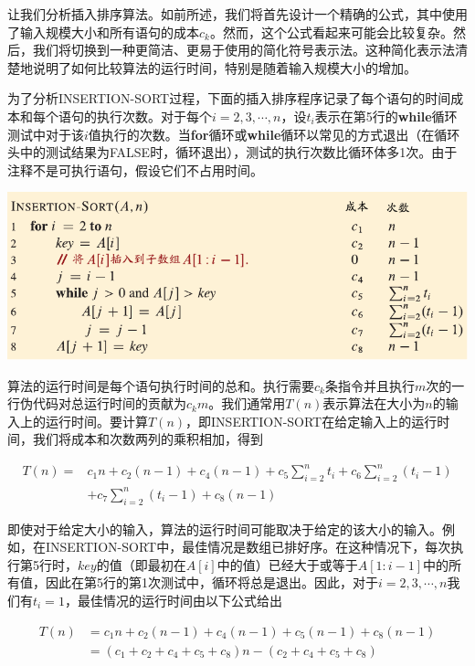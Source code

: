 \documentclass[lang=cn,newtx,10pt,scheme=chinese]{elegantbook}
\begin{document}
让我们分析插入排序算法。如前所述，我们将首先设计一个精确的公式，其中使用了输入规模大小和所有语句的成本$c_k$。然而，这个公式看起来可能会比较复杂。然后，我们将切换到一种更简洁、更易于使用的简化符号表示法。这种简化表示法清楚地说明了如何比较算法的运行时间，特别是随着输入规模大小的增加。

为了分析INSERTION-SORT过程，下面的插入排序程序记录了每个语句的时间成本和每个语句的执行次数。对于每个$i=2,3,\cdots,n$，设$t_i$表示在第5行的\textbf{while}循环测试中对于该$i$值执行的次数。当\textbf{for}循环或\textbf{while}循环以常见的方式退出（在循环头中的测试结果为FALSE时，循环退出），测试的执行次数比循环体多1次。由于注释不是可执行语句，假设它们不占用时间。

\includegraphics{算法导论第四版插图/第二章/插入排序时间复杂度的代码.pdf}

算法的运行时间是每个语句执行时间的总和。执行需要$c_k$条指令并且执行$m$次的一行伪代码对总运行时间的贡献为$c_km$。我们通常用$T(n)$表示算法在大小为$n$的输入上的运行时间。要计算$T(n)$，即INSERTION-SORT在给定输入上的运行时间，我们将成本和次数两列的乘积相加，得到

\begin{equation*}
\begin{aligned}
T(n)= & c_1 n+c_2(n-1)+c_4(n-1)+c_5 \sum_{i=2}^n t_i+c_6 \sum_{i=2}^n(t_i-1) \\
& +c_7 \sum_{i=2}^n(t_i-1)+c_8(n-1)
\end{aligned}
\end{equation*}

即使对于给定大小的输入，算法的运行时间可能取决于给定的该大小的输入。例如，在INSERTION-SORT中，最佳情况是数组已排好序。在这种情况下，每次执行第5行时，$key$的值（即最初在$A[i]$中的值）已经大于或等于$A[1:i-1]$中的所有值，因此在第5行的第1次测试中，循环将总是退出。因此，对于$i=2,3,\cdots,n$我们有$t_i=1$，最佳情况的运行时间由以下公式给出

\begin{equation}\label{eq:2.1}
\begin{aligned}
T(n) & =c_1 n+c_2(n-1)+c_4(n-1)+c_5(n-1)+c_8(n-1) \\
& =(c_1+c_2+c_4+c_5+c_8)n-(c_2+c_4+c_5+c_8)
\end{aligned}
\end{equation}
\end{document}
